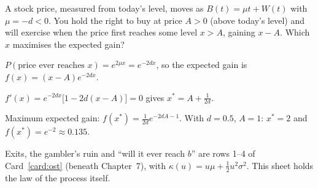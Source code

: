 \begin{pic}
\end{pic}

\begin{example}
\label{ex:sell}
A stock price, measured from today's level, moves as $B(t)=\mu t+W(t)$ with $\mu=-d<0$. You hold the right to buy at price $A>0$ (above today's level) and will exercise when the price first reaches some level $x>A$, gaining $x-A$. Which $x$ maximises the expected gain?
\begin{steps}
  \item $P(\text{price ever reaches }x)=e^{2\mu x}=e^{-2dx}$, so the expected gain is $f(x)=(x-A)e^{-2dx}$.
  \item $f'(x)=e^{-2dx}\big[1-2d(x-A)\big]=0$ gives $x^*=A+\frac{1}{2d}$.
  \item Maximum expected gain: $f(x^*)=\frac{1}{2d}e^{-2dA-1}$. With $d=0.5$, $A=1$: $x^*=2$ and $f(x^*)=e^{-2}\approx0.135$.
\end{steps}
\end{example}


Exits, the gambler's ruin and ``will it ever reach $b$'' are rows 1--4 of Card~\ref{card:ost} (beneath Chapter~7), with $\kappa(u)=u\mu+\frac12u^2\sigma^2$. This sheet holds the law of the process itself.

